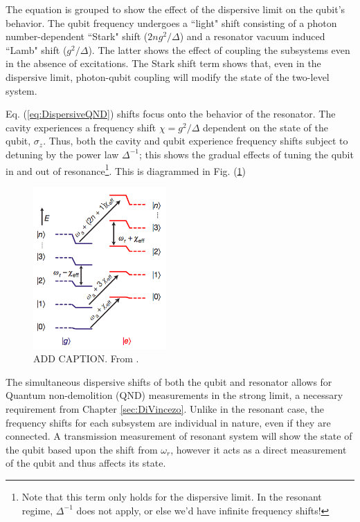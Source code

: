 \documentclass[12 pt]{book}
\begin{document}
The equation is grouped to show the effect of the dispersive limit on the qubit's behavior. The qubit frequency undergoes a ``light" shift consisting of a photon number-dependent ``Stark" shift ($2ng^2/\Delta$) and a resonator vacuum induced ``Lamb" shift ($g^2/\Delta$)\cite{Schuster}. The latter shows the effect of coupling the subsystems even in the absence of excitations. The Stark shift term shows that, even in the dispersive limit, photon-qubit coupling will modify the state of the two-level system. 

Eq. (\ref{eq:DispersiveQND}) shifts focus onto the behavior of the resonator. The cavity experiences a frequency shift $\chi=g^2/\Delta$ dependent on the state of the qubit, $\sigma_z$. Thus, both the cavity and qubit experience frequency shifts subject to detuning by the power law $\Delta^{-1}$; this shows the gradual effects of tuning the qubit in and out of resonance\footnote{Note that this term only holds for the dispersive limit. In the resonant regime, $\Delta^{-1}$ does not apply, or else we'd have infinite frequency shifts!}. This is diagrammed in Fig. (\ref{fig:DispersiveEnergyLevels})

\begin{figure}[h] 
   \centering
   \includegraphics[width=2in]{SchusterDispersiveEnergyLevels.png} 
   \caption{ADD CAPTION. From \cite{Schuster}.}
   \label{fig:DispersiveEnergyLevels}
\end{figure}

The simultaneous dispersive shifts of both the qubit and resonator allows for Quantum non-demolition (QND) measurements in the strong limit, a necessary requirement from Chapter \ref{sec:DiVincezo}. Unlike in the resonant case, the frequency shifts for each subsystem are individual in nature, even if they are connected. A transmission measurement of resonant system will show the state of the qubit based upon the shift from $\omega_r$, however it acts as a direct measurement of the qubit and thus affects its state.
\end{document}
